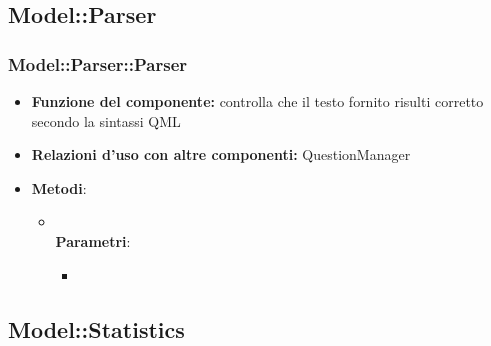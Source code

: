 \begin{itemize}
\subsection{Model::Parser}
\subsubsection{Model::Parser::Parser}
\begin{itemize}
\item\textbf{Funzione del componente:} controlla che il testo fornito risulti corretto secondo la sintassi QML
\item\textbf{Relazioni d'uso con altre componenti:} QuestionManager\\
\item\textbf{Metodi}:
	\begin{itemize}
		\item{}\\
		\textbf{Parametri}:
			\begin{itemize}
				\item{}\\
			\end{itemize}
	\end{itemize}
\end{itemize}

\subsection{Model::Statistics}

\end{itemize}
